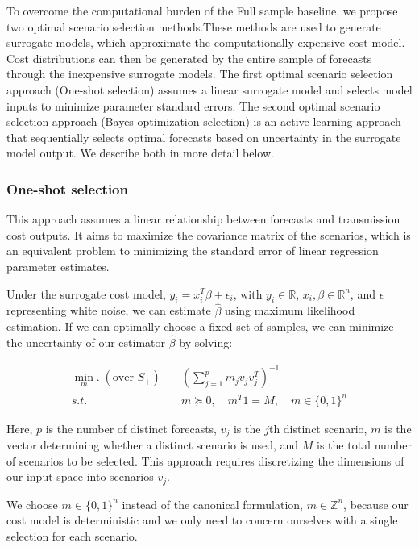 \documentclass[10pt,twocolumn,letterpaper]{article}
\begin{document}
To overcome the computational burden of the Full sample baseline, we propose two optimal scenario selection methods.These methods are used to generate surrogate models, which approximate the computationally expensive cost model. Cost distributions can then be generated by the entire sample of forecasts through the inexpensive surrogate models. The first optimal scenario selection approach (One-shot selection) assumes a linear surrogate model and selects model inputs to minimize parameter standard errors. The second optimal scenario selection approach (Bayes optimization selection) is an active learning approach that sequentially selects optimal forecasts based on uncertainty in the surrogate model output. We describe both in more detail below. 

\subsubsection{One-shot selection}
This approach assumes a linear relationship between forecasts and transmission cost outputs. It aims to maximize the covariance matrix of the scenarios, which is an equivalent problem to minimizing the standard error of linear regression parameter estimates. 

Under the surrogate cost model, $y_i = x_i^T\beta + \epsilon_i$, with $y_i \in \mathbb{R}$, $x_i, \beta \in \mathbb{R}^n$, and $\epsilon$ representing white noise, we can estimate $\hat{\beta}$ using maximum likelihood estimation. If we can optimally choose a fixed set of samples, we can minimize the uncertainty of our estimator $\hat{\beta}$ by solving:

\begin{align*}
\min_m. \;(\textrm{over } S_+) \quad & \left(\sum_{j=1}^pm_jv_jv_j^T\right)^{-1}\\
s.t. \quad & m \succeq 0, \quad m^T1 = M, \quad m \in \{0, 1\}^n
\end{align*}

Here, $p$ is the number of distinct forecasts, $v_j$ is the $j$th distinct scenario, $m$ is the vector determining whether a distinct scenario is used, and $M$ is the total number of scenarios to be selected. This approach requires discretizing the dimensions of our input space into scenarios $v_j$. 

We choose $m \in \{0, 1\}^n$ instead of the canonical formulation, $m \in \mathbb{Z}^n$, because our cost model is deterministic and we only need to concern ourselves with a single selection for each scenario.
\end{document}

